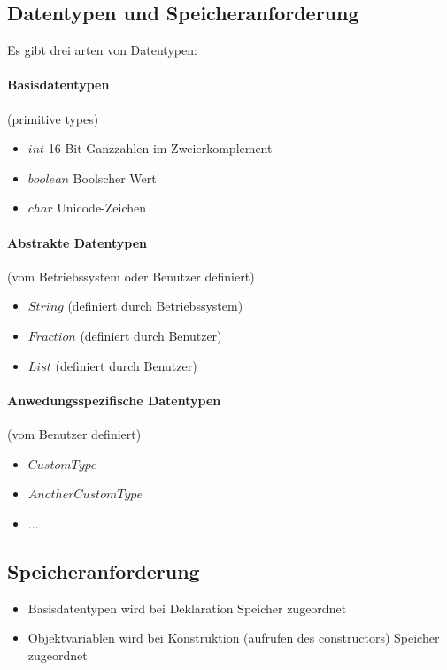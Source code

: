 \documentclass[12pt]{report}
\begin{document}
\subsection{Datentypen und Speicheranforderung}
Es gibt drei arten von Datentypen:
\paragraph{Basisdatentypen} (primitive types)
\begin{itemize}
  \item $int$ 16-Bit-Ganzzahlen im Zweierkomplement
  \item $boolean$ Boolscher Wert
  \item $char$ Unicode-Zeichen
\end{itemize}

\paragraph{Abstrakte Datentypen} (vom Betriebssystem oder Benutzer definiert)
\begin{itemize}
  \item $String$ (definiert durch Betriebssystem)
  \item $Fraction$ (definiert durch Benutzer)
  \item $List$ (definiert durch Benutzer)
\end{itemize}

\paragraph{Anwedungsspezifische Datentypen} (vom Benutzer definiert)
\begin{itemize}
  \item $CustomType$
  \item $AnotherCustomType$
  \item $...$
\end{itemize}

\subsection{Speicheranforderung}
\begin{itemize}
  \item Basisdatentypen wird bei Deklaration Speicher zugeordnet
  \item Objektvariablen wird bei Konstruktion (aufrufen des constructors) Speicher zugeordnet
\end{itemize}
\end{document}
